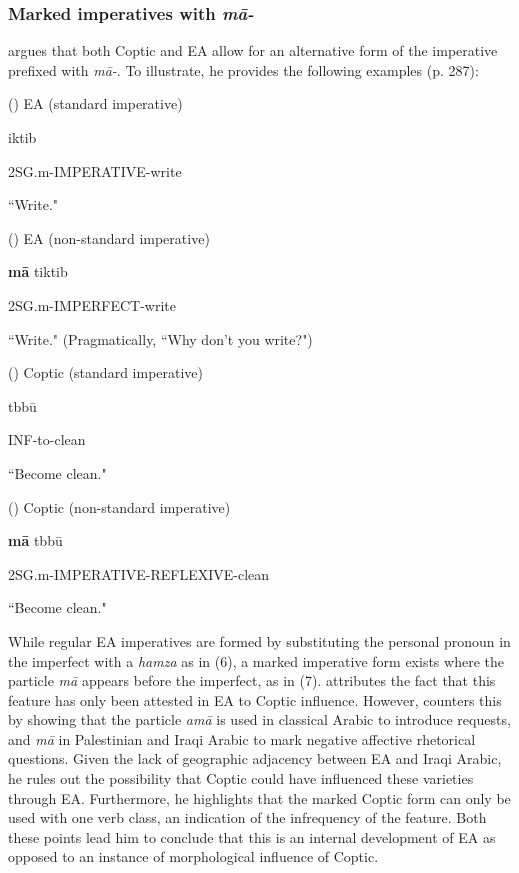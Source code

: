 \documentclass[12pt,a4paper]{article}
\newcounter{example}
\begin{document}
\subsubsection{Marked imperatives with \textit{mā-}}

\textcite{bishai_coptic_1962} argues that both Coptic and EA allow for an alternative form of the imperative prefixed with \textit{mā-}. To illustrate, he provides the following examples (p. 287): 

\vspace{3mm}
(\theexample) EA (standard imperative)

\textglotstop iktib

2SG.m-IMPERATIVE-write

``Write."

\vspace{3mm}
(\theexample) EA (non-standard imperative)

\textbf{mā} tiktib

2SG.m-IMPERFECT-write

``Write." (Pragmatically, ``Why don't you write?")

\vspace{3mm}
(\theexample) Coptic (standard imperative)

tbbū

INF-to-clean

``Become clean."

\vspace{3mm}
(\theexample) Coptic (non-standard imperative)

\textbf{mā} tbbū

2SG.m-IMPERATIVE-REFLEXIVE-clean

``Become clean."
\vspace{3mm}

While regular EA imperatives are formed by substituting the personal pronoun in the imperfect with a \textit{hamza} as in (6), a marked imperative form exists where the particle \textit{mā} appears before the imperfect, as in (7). \textcite{bishai_coptic_1962} attributes the fact that this feature has only been attested in EA to Coptic influence. However, \textcite{palva_notes_1969} counters this by showing that the particle \textit{amā} is used in classical Arabic to introduce requests, and \textit{mā} in Palestinian and Iraqi Arabic to mark negative affective rhetorical questions. Given the lack of geographic adjacency between EA and Iraqi Arabic, he rules out the possibility that Coptic could have influenced these varieties through EA. Furthermore, he highlights that the marked Coptic form can only be used with one verb class, an indication of the infrequency of the feature. Both these points lead him to conclude that this is an internal development of EA as opposed to an instance of morphological influence of Coptic.
\end{document}
